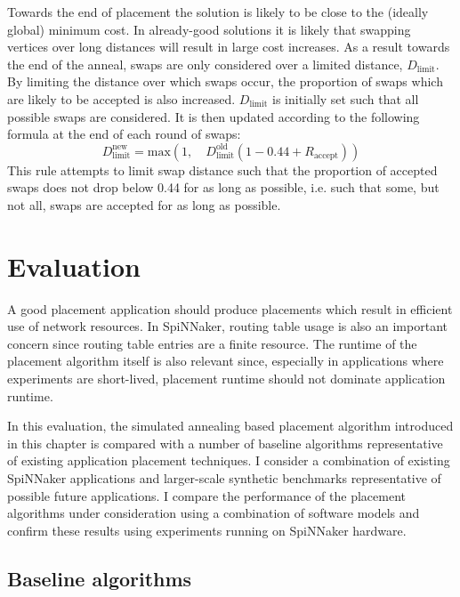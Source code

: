 				Towards the end of placement the solution is likely to be close to the
				(ideally global) minimum cost. In already-good solutions it is likely
				that swapping vertices over long distances will result in large cost
				increases. As a result towards the end of the anneal, swaps are only
				considered over a limited distance, $D_\textrm{limit}$. By limiting the
				distance over which swaps occur, the proportion of swaps which are
				likely to be accepted is also increased. $D_\textrm{limit}$ is
				initially set such that all possible swaps are considered. It is then
				updated according to the following formula at the end of each round of
				swaps:
				\[
					D_\textrm{limit}^\textrm{new} =
						\textrm{max}(1,\quad D_\textrm{limit}^\textrm{old}(1-0.44 + R_\textrm{accept}))
				\]
				This rule attempts to limit swap distance such that the proportion of
				accepted swaps does not drop below 0.44 for as long as possible, i.e.
				such that some, but not all, swaps are accepted for as long as
				possible.
	
	\section{Evaluation}
		
		\label{sec:placement-results}
		
		A good placement application should produce placements which result in
		efficient use of network resources. In SpiNNaker, routing table usage is
		also an important concern since routing table entries are a finite
		resource. The runtime of the placement algorithm itself is also
		relevant since, especially in applications where experiments are
		short-lived, placement runtime should not dominate application runtime.
		
		In this evaluation, the simulated annealing based placement algorithm
		introduced in this chapter is compared with a number of baseline algorithms
		representative of existing application placement techniques. I consider a
		combination of existing SpiNNaker applications and larger-scale synthetic
		benchmarks representative of possible future applications. I compare the
		performance of the placement algorithms under consideration using a
		combination of software models and confirm these results using experiments
		running on SpiNNaker hardware.
		
		\subsection{Baseline algorithms}
			
